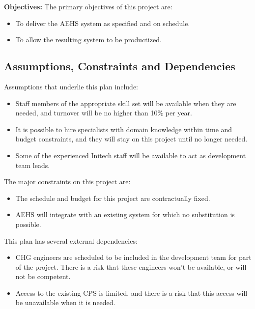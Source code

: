 \documentclass[11pt]{article}
\begin{document}
\textbf{Objectives:} The primary objectives of this project are:
\begin{itemize}
\item To deliver the AEHS system as specified and on schedule.
\item To allow the resulting system to be productized.
\end{itemize}


\subsection{Assumptions, Constraints and Dependencies}

Assumptions that underlie this plan include:

\begin{itemize}
\item Staff members of the appropriate skill set will be available when they are needed, and turnover
  will be no higher than 10\% per year.
\item It is possible to hire specialists with domain knowledge within time and budget constraints,
  and they will stay on this project until no longer needed.
\item Some of the experienced Initech staff will be available to act as development team leads.
\end{itemize}

The major constraints on this project are:

\begin{itemize}
\item The schedule and budget for this project are contractually fixed.
\item AEHS will integrate with an existing system for which no substitution is possible.
\end{itemize}

This plan has several external dependencies:

\begin{itemize}
\item CHG engineers are scheduled to be included in the development team for part of the project.
  There is a risk that these engineers won't be available, or will not be competent.
\item Access to the existing CPS is limited, and there is a risk that this access will be
  unavailable when it is needed.
\end{itemize}
\end{document}
